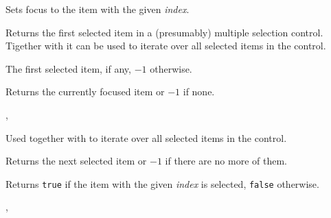\label{wxlistviewfocus}


Sets focus to the item with the given {\it index}.


\label{wxlistviewgetfirstselected}


Returns the first selected item in a (presumably) multiple selection control.
Tigether with  it can be
used to iterate over all selected items in the control.


The first selected item, if any, $-1$ otherwise.


\label{wxlistviewgetfocuseditem}


Returns the currently focused item or $-1$ if none.


,\\


\label{wxlistviewgetnextselected}


Used together with  to
iterate over all selected items in the control.


Returns the next selected item or $-1$ if there are no more of them.


\label{wxlistviewisselected}


Returns {\tt true} if the item with the given {\it index} is selected, 
{\tt false} otherwise.


,\\


\label{wxlistviewselect}

